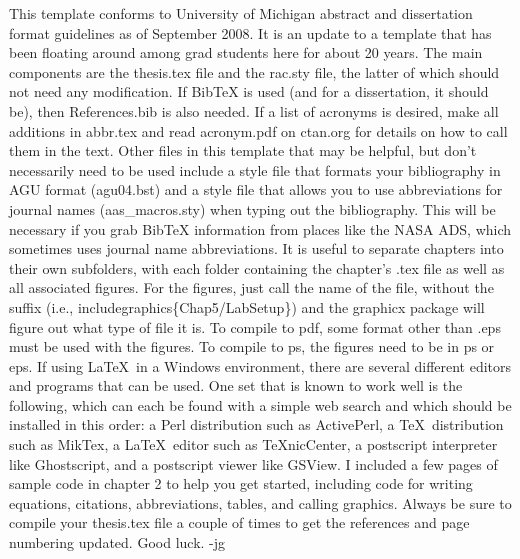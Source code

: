 This template conforms to University of Michigan abstract and dissertation format guidelines as of September 2008. It is an update to a template that has been floating around among grad students here for about 20 years. The main components are the thesis.tex file and the rac.sty file, the latter of which should not need any modification. If BibTeX is used (and for a dissertation, it should be), then References.bib is also needed. If a list of acronyms is desired, make all additions in abbr.tex and read acronym.pdf on ctan.org for details on how to call them in the text. Other files in this template that may be helpful, but don't necessarily need to be used include a style file that formats your bibliography in AGU format (agu04.bst) and a style file that allows you to use abbreviations for journal names (aas\_macros.sty) when typing out the bibliography. This will be necessary if you grab BibTeX information from places like the NASA ADS, which sometimes uses journal name abbreviations. It is useful to separate chapters into their own subfolders, with each folder containing the chapter's .tex file as well as all associated figures. For the figures, just call the name of the file, without the suffix (i.e., includegraphics\{Chap5/LabSetup\}) and the graphicx package will figure out what type of file it is. To compile to pdf, some format other than .eps must be used with the figures. To compile to ps, the figures need to be in ps or eps. If using \LaTeX\, in a Windows environment, there are several different editors and programs that can be used. One set that is known to work well is the following, which can each be found with a simple web search and which should be installed in this order: a Perl distribution such as ActivePerl, a \TeX\, distribution such as MikTex, a \LaTeX\, editor such as TeXnicCenter, a postscript interpreter like Ghostscript, and a postscript viewer like GSView. I included a few pages of sample code in chapter 2 to help you get started, including code for writing equations, citations, abbreviations, tables, and calling graphics. Always be sure to compile your thesis.tex file a couple of times to get the references and page numbering updated. Good luck. -jg